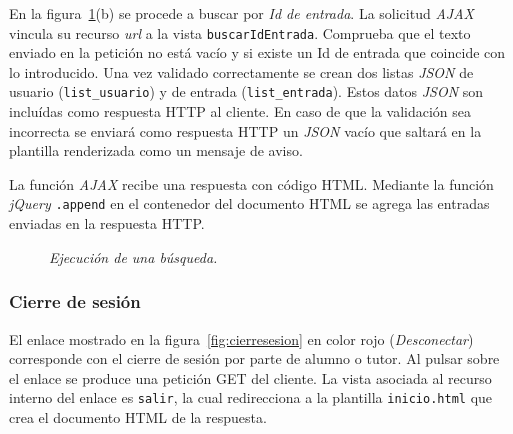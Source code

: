 \documentclass[a4paper, 12pt]{book}
\begin{document}
\begin{itemize}
  En la figura~\ref{fig:buscarajax}(b) se procede a buscar por \textit{Id de entrada}. La solicitud \textit{AJAX} vincula su recurso \textit{url} a la 
  vista \texttt{buscarIdEntrada}. Comprueba que el texto enviado en la petici\'on no est\'a vac\'io y si existe un Id de entrada que coincide con lo
  introducido. Una vez validado correctamente se crean dos listas \textit{JSON} de usuario (\texttt{list\_usuario}) y de entrada (\texttt{list\_entrada}). 
  Estos datos \textit{JSON} son inclu\'idas como respuesta HTTP al cliente. En caso de que la validaci\'on sea incorrecta se enviar\'a como respuesta HTTP 
  un \textit{JSON} vac\'io que saltar\'a en la plantilla renderizada como un mensaje de aviso.
  
  La funci\'on \textit{AJAX} recibe una respuesta con c\'odigo HTML. Mediante la funci\'on \textit{jQuery} \texttt{.append} en el contenedor del documento 
  HTML se agrega las entradas enviadas en la respuesta HTTP.
  
  \begin{figure}
    \centering
    \caption{\textit{Ejecuci\'on de una b\'usqueda.}}
    \label{fig:buscarajax}
  \end{figure}
  
\end{itemize}





\subsubsection{Cierre de sesi\'on} 
\label{sec:cierresesion}
El enlace mostrado en la figura~\ref{fig:cierresesion} en color rojo (\textit{Desconectar}) corresponde con el cierre de sesi\'on por parte de alumno o 
tutor. Al pulsar sobre el enlace se produce una petici\'on GET del cliente. La vista asociada al recurso interno del enlace es \texttt{salir}, la cual 
redirecciona a la plantilla \texttt{inicio.html} que crea el documento HTML de la respuesta.
\end{document}
